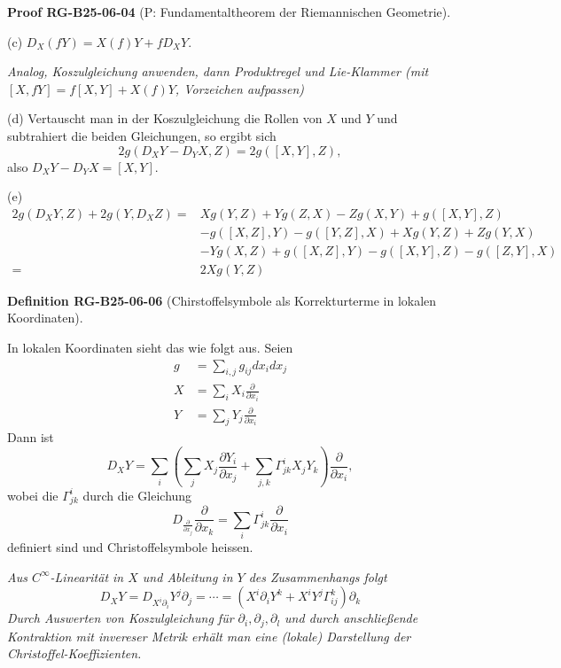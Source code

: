 \documentclass[10pt, letterpaper]{article}
\newenvironment{note}{\par\begingroup\color{hellblau}\itshape}{\par\endgroup}
\newcommand{\CustomHeading}[3]{%
  \par\medskip\noindent%
  \textbf{#1 #2} \textnormal{(#3)}.\enskip%
}
\newenvironment{DEF}[2]{\begin{unitbox}\CustomHeading{Definition}{#1}{#2}}{\end{unitbox}}
\newenvironment{PROOF}[2]{\begin{unitbox}\CustomHeading{Proof}{#1}{#2}}{\end{unitbox}}
\begin{document}
\begin{PROOF}{RG-B25-06-04}{P: Fundamentaltheorem der Riemannischen Geometrie}
(c) $D_{X}(f Y)=X(f) Y+f D_{X} Y$.
\begin{note}
  Analog, Koszulgleichung anwenden, dann Produktregel und Lie-Klammer (mit $[X,fY]=f[X,Y]+X(f)Y$, Vorzeichen aufpassen)
\end{note}

(d) Vertauscht man in der Koszulgleichung die Rollen von $X$ und $Y$ und subtrahiert die beiden Gleichungen, so ergibt sich
$$
2 g\left(D_{X} Y-D_{Y} X, Z\right)=2 g([X, Y], Z),
$$
also $D_{X} Y-D_{Y} X=[X, Y]$.

(e)
$$
\begin{aligned}
2 g\left(D_{X} Y, Z\right)+2 g\left(Y, D_{X} Z\right)= & X g(Y, Z)+Y g(Z, X)-Z g(X, Y)+g([X, Y], Z) \\
& -g([X, Z], Y)-g([Y, Z], X)+X g(Y, Z)+Z g(Y, X) \\
& -Y g(X, Z)+g([X, Z], Y)-g([X, Y], Z)-g([Z, Y], X) \\
= & 2 X g(Y, Z)
\end{aligned}
$$
\end{PROOF}





\begin{DEF}{RG-B25-06-06}{Chirstoffelsymbole als Korrekturterme in lokalen Koordinaten}
In lokalen Koordinaten sieht das wie folgt aus. Seien
$$
\begin{aligned}
g & =\sum_{i, j} g_{i j} d x_{i} d x_{j} \\
X & =\sum_{i} X_{i} \frac{\partial}{\partial x_{i}} \\
Y & =\sum_{j} Y_{j} \frac{\partial}{\partial x_{i}}
\end{aligned}
$$
Dann ist
$$
D_{X} Y=\sum_{i}\left(\sum_{j} X_{j} \frac{\partial Y_{i}}{\partial x_{j}}+\sum_{j, k} \Gamma_{j k}^{i} X_{j} Y_{k}\right) \frac{\partial}{\partial x_{i}},
$$
wobei die $\Gamma_{j k}^{i}$ durch die Gleichung
$$
D_{\frac{\partial}{\partial x_{j}}} \frac{\partial}{\partial x_{k}}=\sum_{i} \Gamma_{j k}^{i} \frac{\partial}{\partial x_{i}}
$$
definiert sind und Christoffelsymbole heissen.
\begin{note}
  Aus $C^\infty$-Linearität in $X$ und Ableitung in $Y$ des Zusammenhangs folgt
  $$D_XY=D_{X^i\partial_i}Y^j\partial_j= \cdots = (X^i\partial_iY^k+X^iY^j\Gamma_{ij}^k)\partial_k$$
  Durch Auswerten von Koszulgleichung für $\partial_i,\partial_j,\partial_l$ und durch anschließende Kontraktion mit invereser Metrik erhält man eine (lokale) Darstellung der Christoffel-Koeffizienten.  
\end{note}
\end{DEF} 
\end{document}
